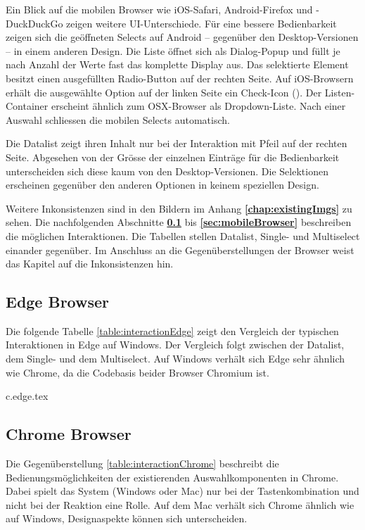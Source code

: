Ein Blick auf die mobilen Browser wie iOS-Safari, Android-Firefox und -DuckDuckGo zeigen weitere UI-Unterschiede. 
Für eine bessere Bedienbarkeit zeigen sich die geöffneten Selects auf Android – gegenüber den Desktop-Versionen – in einem anderen Design. 
Die Liste öffnet sich als Dialog-Popup und füllt je nach Anzahl der Werte fast das komplette Display aus. 
Das selektierte Element besitzt einen ausgefüllten Radio-Button auf der rechten Seite. 
Auf iOS-Browsern erhält die ausgewählte Option auf der linken Seite ein Check-Icon (\cmark). 
Der Listen-Container erscheint ähnlich zum OSX-Browser als Dropdown-Liste. 
Nach einer Auswahl schliessen die mobilen Selects automatisch. 

Die Datalist zeigt ihren Inhalt nur bei der Interaktion mit Pfeil auf der rechten Seite. 
Abgesehen von der Grösse der einzelnen Einträge für die Bedienbarkeit unterscheiden sich diese kaum von den Desktop-Versionen.
Die Selektionen erscheinen gegenüber den anderen Optionen in keinem speziellen Design. 

Weitere Inkonsistenzen sind in den Bildern im Anhang \textbf{\ref{chap:existingImgs}} zu sehen. 
Die nachfolgenden Abschnitte \textbf{\ref{sec:edgeBrowser}} bis \textbf{\ref{sec:mobileBrowser}} beschreiben die möglichen Interaktionen. 
Die Tabellen stellen Datalist, Single- und Multiselect einander gegenüber. 
Im Anschluss an die Gegenüberstellungen der Browser weist das Kapitel \textbf{} auf die Inkonsistenzen hin. 


\clearpage
\subsection{Edge Browser}
\label{sec:edgeBrowser}

Die folgende Tabelle \ref{table:interactionEdge} zeigt den Vergleich der typischen Interaktionen in Edge auf Windows. 
Der Vergleich folgt zwischen der Datalist, dem Single- und dem Multiselect. 
Auf Windows verhält sich Edge sehr ähnlich wie Chrome, da die Codebasis beider Browser Chromium ist. 

{c.edge.tex}


\clearpage
\subsection{Chrome Browser}
\label{sec:chromeBrowser}

Die Gegenüberstellung \ref{table:interactionChrome} beschreibt die Bedienungsmöglichkeiten der existierenden Auswahlkomponenten in Chrome. 
Dabei spielt das System (Windows oder Mac) nur bei der Tastenkombination und nicht bei der Reaktion eine Rolle. 
Auf dem Mac verhält sich Chrome ähnlich wie auf Windows, Designaspekte können sich unterscheiden. 

